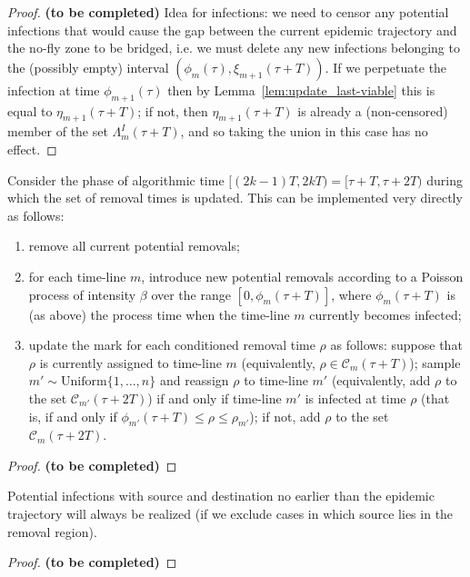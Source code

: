 \documentclass[]{article}
\newcommand{\Conditioned}{\mathcal{C}}
\begin{document}
 \begin{proof}
 	\textbf{(to be completed)}
 	Idea for infections: we need to censor any potential infections that would cause the gap between the current epidemic trajectory and the no-fly zone to be bridged, i.e. we must delete any new infections belonging to the (possibly empty) interval \((\phi_m(\tau), \xi_{m+1}(\tau+T)) \). If we perpetuate the infection at time \(\phi_{m+1}(\tau)\) then by Lemma~\ref{lem:update_last-viable} this is equal to \(\eta_{m+1}(\tau+T)\); if not, then \(\eta_{m+1}(\tau+T)\) is already a (non-censored) member of the set \(\Lambda^I_m(\tau+T)\), and so taking the union in this case has no effect.
 	\end{proof}

  \begin{lem}\label{lem:removal1}
  Consider the phase of algorithmic time \([(2k-1)T, 2kT) = [\tau+T,\tau+2T)\) during
  which the set of removal times is updated.
  This can be implemented very directly as follows:
\begin{enumerate}
\item remove all current potential removals;
\item for each time-line \(m\), introduce new potential removals
  according to a Poisson process of intensity \(\beta\) over the range
  \([0,\phi_m(\tau+T)]\), where \(\phi_m(\tau+T)\) is (as above) the process time when the time-line \(m\) currently becomes infected;
\item update the mark for each conditioned removal time \(\rho\) as follows:
  suppose that \(\rho\) is currently assigned to time-line \(m\)
  (equivalently, \(\rho\in\Conditioned_m(\tau+T)\)); sample
  \(m'\sim\textrm{Uniform}\{1,\dots,n\}\) and reassign \(\rho\) to
  time-line \(m'\) (equivalently, add \(\rho\) to the set \(\Conditioned_{m'}(\tau+2T)\)) if and only if
  time-line \(m'\) is infected at time \(\rho\) (that is, if and
  only if \(\phi_{m'}(\tau+T) \le \rho \le \rho_{m'}\)); if not, add \(\rho\) to the set \(\Conditioned_m(\tau + 2T)\).
\end{enumerate}
 \end{lem}
 \begin{proof}
  \textbf{(to be completed)}
 \end{proof}
 
 \begin{lem}\label{lem:infect1}
  Potential infections with source and destination no earlier than the epidemic trajectory will always be realized
  (if we exclude cases in which source lies in the removal region).
 \end{lem}
 \begin{proof}
  \textbf{(to be completed)}
 \end{proof}
\end{document}
